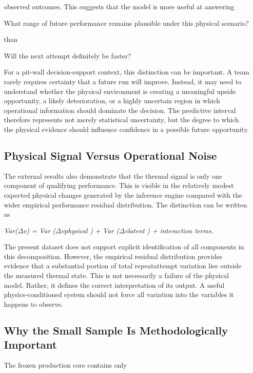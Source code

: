 observed outcomes. This suggests that the model is more useful at answering

What range of future performance remains plausible under this physical scenario?

than

Will the next attempt definitely be faster?

For a pit-wall decision-support context, this distinction can be important. A team rarely requires certainty that a future run will improve. Instead, it may need to understand whether the physical environment is creating a meaningful upside opportunity, a likely deterioration, or a highly uncertain region in which operational information should dominate the decision. The predictive interval therefore represents not merely statistical uncertainty, but the degree to which the physical evidence should influence confidence in a possible future opportunity.

\subsection{Physical Signal Versus Operational Noise}
The external results also demonstrate that the thermal signal is only one component of qualifying performance. This is visible in the relatively modest expected physical changes generated by the inference engine compared with the wider empirical performance residual distribution. The distinction can be written as

\begin{center}\textit{Var(\ensuremath{\Delta}v) = Var (\ensuremath{\Delta}vphysical ) + Var (\ensuremath{\Delta}vlatent ) + interaction terms.}\end{center}

The present dataset does not support explicit identification of all components in this decomposition. However, the empirical residual distribution provides evidence that a substantial portion of total repeatattempt variation lies outside the measured thermal state. This is not necessarily a failure of the physical model. Rather, it defines the correct interpretation of its output. A useful physics-conditioned system should not force all variation into the variables it happens to observe.

\subsection{Why the Small Sample Is Methodologically Important}
The frozen production core contains only

